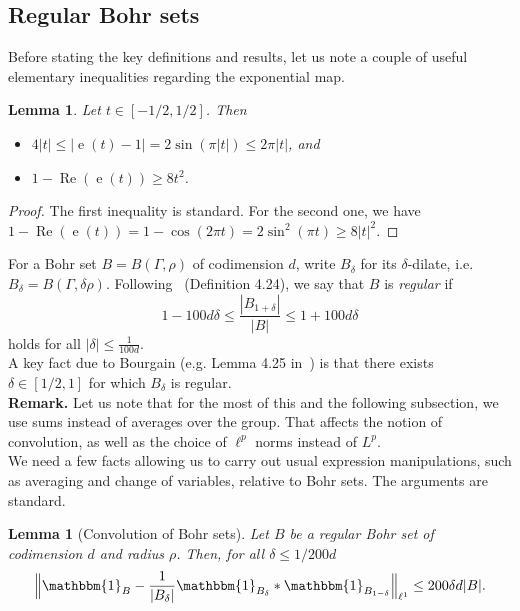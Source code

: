 \documentclass[a4paper,11pt]{article}
\numberwithin{theorem}{section}
\newtheorem{lemma}[theorem]{Lemma}
\theoremstyle{definition}
\newcommand\id{\mathbbm{1}}
\newcommand{\on}[1]{
	\operatorname{#1}
}
\begin{document}
\subsection{Regular Bohr sets}

Before stating the key definitions and results, let us note a couple of useful elementary inequalities regarding the exponential map.

\begin{lemma}\label{elemExp} Let $t \in [-1/2,1/2]$. Then
    \begin{itemize}
        \item $4|t| \leq |\on{e}(t) - 1| = 2\sin(\pi |t|)\leq 2 \pi |t|$, and
        \item $1 - \on{Re}(\on{e}(t)) \geq 8t^2$.
    \end{itemize}
\end{lemma}

\begin{proof}
    The first inequality is standard. For the second one, we have $1 - \on{Re}(\on{e}(t)) = 1- \cos(2 \pi t) = 2 \sin^2(\pi t) \geq 8 |t|^2$. 
\end{proof}


For a Bohr set $B = B(\Gamma, \rho)$ of codimension $d$, write $B_\delta$ for its $\delta$-dilate, i.e. $B_\delta = B(\Gamma, \delta \rho)$. Following~\cite{TaoVuBook} (Definition 4.24), we say that $B$ is \textit{regular} if
\[1 - 100d\delta\leq \frac{|B_{1 + \delta}|}{|B|} \leq 1+100d\delta\]
holds for all $|\delta| \leq \frac{1}{100d}$.\\

A key fact due to Bourgain (e.g. Lemma 4.25 in~\cite{TaoVuBook}) is that there exists $\delta \in [1/2, 1]$ for which $B_\delta$ is regular.\\

\noindent\textbf{Remark.} Let us note that for the most of this and the following subsection, we use sums instead of averages over the group. That affects the notion of convolution, as well as the choice of $\ell^p$ norms instead of $L^p$.\\

We need a few facts allowing us to carry out usual expression manipulations, such as averaging and change of variables, relative to Bohr sets. The arguments are standard. 

\begin{lemma}[Convolution of Bohr sets]\label{regbohrconvolution}
    Let $B$ be a regular Bohr set of codimension $d$ and radius $\rho$. Then, for all $\delta \leq 1/200d$
    \[\Big\|\id_B - \frac{1}{|B_{\delta}|}\id_{B_\delta} \ast \id_{B_{1-\delta}}\Big\|_{\ell^1} \leq 200 \delta d |B|.\]
\end{lemma}
\end{document}
